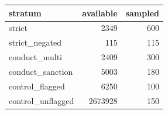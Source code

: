 \begin{table}[htbp]
\centering
\label{tab:annotation_strata}
\begin{tabular}{lrr}
\toprule
stratum & available & sampled \\
\midrule
strict & 2349 & 600 \\
strict\_negated & 115 & 115 \\
conduct\_multi & 2409 & 300 \\
conduct\_sanction & 5003 & 180 \\
control\_flagged & 6250 & 100 \\
control\_unflagged & 2673928 & 150 \\
\bottomrule
\end{tabular}
\end{table}
